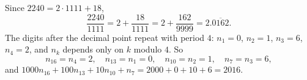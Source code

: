 Since $2240=2\cdot1111+18$,
\[
\dfrac{2240}{1111}=2+\dfrac{18}{1111}=2+\dfrac{162}{9999}=2.\overline{0162}.
\]
The digits after the decimal point repeat with period $4$: $n_1=0$, $n_2=1$, $n_3=6$, $n_4=2$, and $n_k$ depends only on $k$ modulo $4$. So
\[
n_{16}=n_4=2,\quad n_{13}=n_1=0,\quad n_{10}=n_2=1,\quad n_7=n_3=6,
\]
and $1000n_{16}+100n_{13}+10n_{10}+n_7=2000+0+10+6=\boxed{2016}$.
